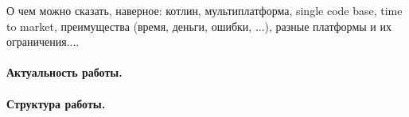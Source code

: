 

О чем можно сказать, наверное: 
котлин, мультиплатформа, single code base, time to market, преимущества (время, деньги, ошибки, ...), разные платформы и их ограничения....

\paragraph{Актуальность работы.}
\cite{so-file-io-with-kotlin-multiplatform, so-read-write-file-in-kotlin-native-ios-side, reddit-multiplatform-file-io, reddit-kotlin-native-library-io, kotlinlang-multiplatform-file-interaction}

\paragraph{Структура работы.} 
